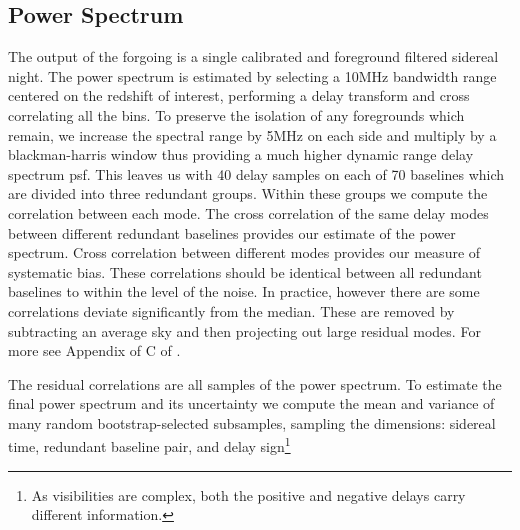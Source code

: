 \documentclass[preprint]{aastex}
\begin{document}

\subsection{Power Spectrum}
The output of the forgoing is a single calibrated and foreground filtered sidereal night. The power spectrum is estimated by selecting a 10MHz bandwidth range centered on the redshift of interest, performing a delay transform and cross correlating all the bins.  To preserve the isolation of any foregrounds which remain, we increase the spectral range by 5MHz on each side and multiply by a blackman-harris window thus providing a much higher dynamic range delay spectrum psf.  This leaves us with 40 delay samples on each of 70 baselines which are divided into three redundant groups. Within these groups we compute the  correlation between each mode.  The cross correlation of the same delay modes between different redundant baselines provides our estimate of the power spectrum.  Cross correlation between different modes provides our measure of systematic bias.  These correlations should be identical between all redundant baselines to within the level of the noise. In practice, however there are some correlations deviate significantly from the median.  These are removed by subtracting an average sky and then projecting out large residual modes.  For more see Appendix of C of \cite{Parsons:2013p9876}.

The residual correlations are all samples of the power spectrum. To estimate the final power spectrum and its uncertainty we compute the mean and variance of many random bootstrap-selected subsamples, sampling the dimensions: sidereal time, redundant baseline pair, and delay sign\footnote{As visibilities are complex, both the positive and negative delays  carry different information.}
\end{document}
